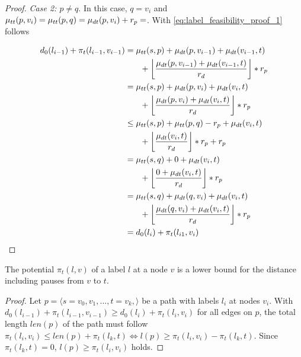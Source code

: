 \begin{proof}
	\emph{Case 2: $p \neq q$}. In this case, $q = v_i$ and $\mu_{tt}(p,v_i) = \mu_{tt}(p,q) = \mu_{dt}(p,v_i) + r_p = $. With \ref{eq:label_feasibility_proof_1} follows

	\begin{align}
		\begin{split}\label{eq:label_feasibility_proof_4}
			d_0(l_{i-1}) + \pi_t(l_{i-1},v_{i-1}) &= \traveltime(s,p) + \drivingtime(p,v_{i-1}) + \drivingtime(v_{i-1},t)\\
			& \phantom{{}=1} + \floor*{ \frac{\drivingtime(p,v_{i-1}) + \drivingtime(v_{i-1},t)}{\restr_d} } * \restr_p\\
			&= \traveltime(s,p) + \drivingtime(p,v_{i}) + \drivingtime(v_{i},t)\\
			& \phantom{{}=1} + \floor*{ \frac{\drivingtime(p,v_{i}) + \drivingtime(v_{i},t)}{\restr_d} } * \restr_p\\
			&\le \traveltime(s,p) + \traveltime(p,q) - \restr_p + \drivingtime(v_{i},t)\\
			& \phantom{{}=1} + \floor*{ \frac{\drivingtime(v_{i},t)}{\restr_d} } * \restr_p + \restr_p\\
			&= \traveltime(s,q) + 0 + \drivingtime(v_{i},t)\\
			& \phantom{{}=1} + \floor*{ \frac{0 + \drivingtime(v_{i},t)}{\restr_d} } * \restr_p\\
			&= \traveltime(s,q) + \drivingtime(q,v_{i}) + \drivingtime(v_{i},t)\\
			& \phantom{{}=1} + \floor*{ \frac{\drivingtime(q,v_{i}) + \drivingtime(v_{i},t)}{\restr_d} } * \restr_p\\
			&= d_0(l_{i}) + \pi_t(l_{i1},v_{i})
		\end{split}
	\end{align}
\end{proof}

\begin{lemma}\label{lemma:pot_lower_bound_csp}
	The potential $\pi_t(l,v)$ of a label $l$ at a node $v$ is a lower bound for the distance including pauses from $v$ to $t$.
\end{lemma}

\begin{proof}
	Let $p = \langle s=v_0,v_1,...,t=v_k, \rangle$ be a path with labels $l_i$ at nodes $v_i$. With $d_0(l_{i-1}) + \pi_t(l_{i-1},v_{i-1}) \ge d_0(l_{i}) + \pi_t(l_i,v_i)$ for all edges on $p$, the total length $len(p)$ of the path must follow $\pi_t(l_i,v_i) \le len(p) + \pi_t(l_k,t) \Leftrightarrow l(p) \ge \pi_t(l_i,v_i) - \pi_t(l_k,t)$. Since $\pi_t(l_k,t) = 0$, $l(p) \ge \pi_t(l_i,v_i)$ holds.
\end{proof}

